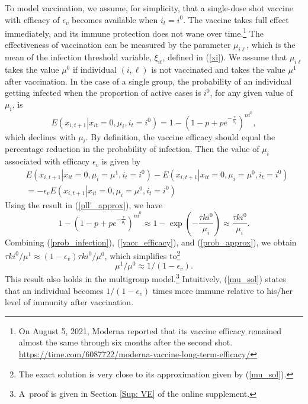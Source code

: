 \documentclass[12pt]{article}
\begin{document}
To model vaccination, we assume, for simplicity, that a single-dose shot
vaccine with efficacy of $\epsilon_{v}$ becomes available when $i_{t}=i^{0}$.
The vaccine takes full effect immediately, and its immune protection does not
wane over time.\footnote{On August 5, 2021, Moderna reported that its vaccine
efficacy remained almost the same through six months after the second shot.
\url{https://time.com/6087722/moderna-vaccine-long-term-efficacy/}} The
effectiveness of vaccination can be measured by the parameter $\mu_{i\ell}$,
which is the mean of the infection threshold variable, $\xi_{it}$, defined in
(\ref{xi}). We assume that $\mu_{i\ell}$ takes the value $\mu^{0}$ if
individual $(i,\ell)$ is not vaccinated and takes the value $\mu^{1}$ after
vaccination. In the case of a single group, the probability of an individual
getting infected when the proportion of active cases is $i^{0}$, for any given
value of $\mu_{i}$, is
\begin{equation}
E\left(  x_{i,t+1}\left\vert x_{it}=0,\mu_{i},i_{t}=i^{0}\right.  \right)
=1-\left(  1-p+pe^{-\frac{\tau}{\mu_{i}}}\right)  ^{ni^{0}},
\label{prob_infection}%
\end{equation}
which declines with $\mu_{i}$. By definition, the vaccine efficacy should
equal the percentage reduction in the probability of infection. Then the value
of $\mu_{i}$ associated with efficacy $\epsilon_{v}$ is given by
\begin{align}
&  E\left(  x_{i,t+1}\left\vert x_{it}=0,\mu_{i}=\mu^{1},i_{t}=i^{0}\right.
\right)  -E\left(  x_{i,t+1}\left\vert x_{it}=0,\mu_{i}=\mu^{0},i_{t}%
=i^{0}\right.  \right) \label{vacc_efficacy}\\
&  =-\epsilon_{v}E\left(  x_{i,t+1}\left\vert x_{it}=0,\mu_{i}=\mu^{0}%
,i_{t}=i^{0}\right.  \right) \nonumber
\end{align}
Using the result in (\ref{pll'_approx}), we have%
\begin{equation}
1-\left(  1-p+pe^{-\frac{\tau}{\mu_{i}}}\right)  ^{ni^{0}}\approx1-\exp\left(
-\frac{\tau ki^{0}}{\mu_{i}}\right)  \approx\frac{\tau ki^{0}}{\mu_{i}}.
\label{prob_approx}%
\end{equation}
Combining (\ref{prob_infection}), (\ref{vacc_efficacy}), and
(\ref{prob_approx}), we obtain $\tau ki^{0}/\mu^{1}\approx\left(
1-\epsilon_{v}\right)  \tau ki^{0}/\mu^{0}$, which simplifies to\footnote{The
exact solution is very close to its approximation given by (\ref{mu_sol}).}%
\begin{equation}
\mu^{1}/\mu^{0}\approx1/(1-\epsilon_{v}). \label{mu_sol}%
\end{equation}
This result also holds in the multigroup model.\footnote{A\ proof is given in
Section \ref{Sup: VE} of the online supplement.} Intuitively, (\ref{mu_sol})
states that an individual becomes $1/\left(  1-\epsilon_{v}\right)  $ times
more immune relative to his/her level of immunity after vaccination.
\end{document}
